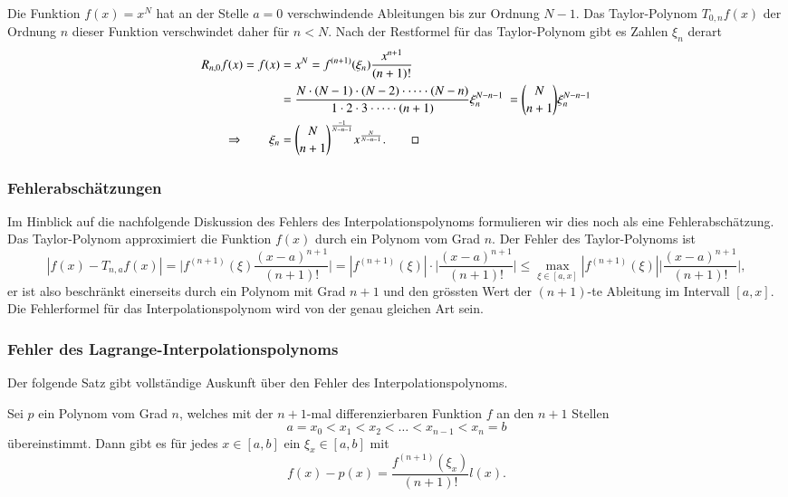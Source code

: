 \begin{beispiel}
Die Funktion $f(x)=x^N$ hat an der Stelle $a=0$ verschwindende
Ableitungen bis zur Ordnung $N-1$.
Das Taylor-Polynom $T_{0,n}f(x)$ der Ordnung $n$ dieser Funktion
verschwindet daher für $n<N$.
%
Nach der Restformel für das Taylor-Polynom gibt es Zahlen $\xi_n$ derart
\begin{align*}
R_{n,0}f(x)
=
f(x)
&=
x^N
= 
f^{(n+1)}(\xi_n) \frac{x^{n+1}}{(n+1)!}
\\
&=
\frac{
N\cdot(N-1)\cdot(N-2)\cdot\dots\cdot(N-n)
}{
1\cdot 2 \cdot 3 \cdot\dots \cdot (n+1)
}
\xi_n^{N-n-1} 
=
\binom{N}{n+1} \xi_n^{N-n-1}
\\
\Rightarrow\qquad
\xi_n
&=
\binom{N}{n+1}^{\frac{-1}{N-n-1}} x^{\frac{N}{N-n-1}}.
\qedhere
\end{align*}
\end{beispiel}

\subsubsection{Fehlerabschätzungen}
%
Im Hinblick auf die nachfolgende Diskussion des Fehlers des
Interpolationspolynoms formulieren wir dies noch als eine
Fehlerabschätzung.
Das Taylor-Polynom approximiert die Funktion $f(x)$ durch ein
Polynom vom Grad $n$.
Der Fehler des Taylor-Polynoms ist
\[
|f(x) - T_{n,a}f(x)|
=
\biggl|
f^{(n+1)}(\xi)
\frac{(x-a)^{n+1}}{(n+1)!}
\biggr|
=
|f^{(n+1)}(\xi)|\cdot
\biggl|
\frac{(x-a)^{n+1}}{(n+1)!}
\biggr|
\le
\max_{\xi\in [a,x]} |f^{(n+1)}(\xi)|
\biggl|
\frac{(x-a)^{n+1}}{(n+1)!}
\biggr|,
\]
er ist also beschränkt einerseits durch ein Polynom mit Grad $n+1$
und den grössten Wert der $(n+1)$-te Ableitung im Intervall $[a,x]$.
Die Fehlerformel für das Interpolationspolynom wird von der genau
gleichen Art sein.
%

\subsubsection{Fehler des Lagrange-Interpolationspolynoms}
%
Der folgende Satz gibt vollständige Auskunft über den Fehler des
Interpolationspolynoms.

\begin{satz}
\label{buch:satz:lagrangefehler}
Sei $p$ ein Polynom vom Grad $n$, welches mit der $n+1$-mal differenzierbaren
Funktion $f$ an den $n+1$ Stellen
\[
a = x_0 < x_1 < x_2 < \dots  < x_{n-1} < x_n=b
\]
übereinstimmt.
Dann gibt es für jedes $x\in[a,b]$ ein $\xi_x\in [a,b]$ mit
\begin{equation}
f(x) - p(x) = \frac{f^{(n+1)}(\xi_x)}{(n+1)!} l(x).
\label{buch:equation:polyfehler}
\end{equation}
\end{satz}

